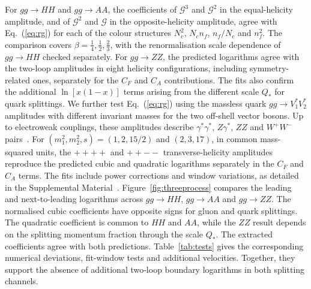 \documentclass[%
 twocolumn,
 superscriptaddress,
 preprintnumbers,
 nofootinbib,
 amsmath,amssymb,
 aps,
 prl,
]{revtex4-2}
\newcommand{\G}{\mathcal G}
\begin{document}
For $gg\to HH$ and $gg\to AA$, the coefficients of
$\G^3$ and $\G^2$ in the equal-helicity amplitude,
and of $\G^2$ and $\G$ in the opposite-helicity
amplitude, agree with Eq.~(\ref{eq:rg}) for each of
the colour structures $N_c^2$, $N_cn_f$, $n_f/N_c$
and $n_f^2$.
The comparison covers $\beta=\frac14,\frac12,\frac23$,
with the renormalisation scale dependence of
$gg\to HH$ checked separately.
For $gg\to ZZ$, the predicted logarithms agree
with the two-loop amplitudes in eight helicity
configurations, including symmetry-related ones,
separately for the $C_F$ and
$C_A$ contributions. The fits also confirm the additional
$\ln[x(1-x)]$ terms arising from the different
scale $Q_*$ for quark splittings.
%
We further test Eq.~(\ref{eq:rg}) using the
massless quark $gg\to V_1^*V_2^*$ amplitudes
with different invariant masses for the two
off-shell vector bosons. Up to electroweak couplings,
these amplitudes describe $\gamma^*\gamma^*$, $Z\gamma^*$,
$ZZ$ and $W^+W^-$ pairs~\cite{vonManteuffel:2015msa}.
For $(m_1^2,m_2^2,s)=(1,2,15/2)$
and $(2,3,17)$, in common mass-squared units,
the $++++$ and $++--$ transverse-helicity
amplitudes reproduce the predicted cubic and
quadratic logarithms separately in the $C_F$
and $C_A$ terms. The fits include power
corrections and window variations, as detailed
in the Supplemental Material~\cite{SM}.
%
Figure~\ref{fig:threeprocess} compares the leading and next-to-leading
logarithms across $gg\to HH$, $gg\to AA$ and $gg\to ZZ$.
The normalised cubic coefficients have opposite signs for gluon and
quark splittings. The quadratic coefficient is common to $HH$ and $AA$,
while the $ZZ$ result depends on the splitting momentum fraction
through the scale $Q_*$. The extracted coefficients agree with both
predictions. Table~\ref{tab:tests} gives the corresponding numerical
deviations, fit-window tests and additional velocities.
Together, they support the absence of additional two-loop
boundary logarithms in both splitting channels.
%
\end{document}
